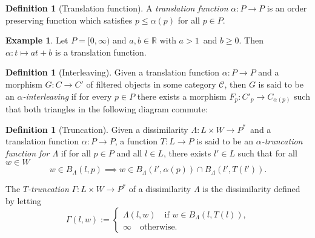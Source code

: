 \documentclass[10pt,a4paper]{article}
\theoremstyle{definition}
\newtheorem{defn}[thm]{Definition}
\newtheorem{ex}{Example}[thm]
\newcommand{\R}{\mathbb{R}}
\begin{document}
\begin{defn}[Translation function]
	A \textit{translation function} $\alpha\colon P\to P$ is an order preserving function which satisfies $p\leq\alpha(p)$ for all $p\in P$. 
\end{defn}

\begin{ex}
	Let $P=[0,\infty)$ and $a,b\in\R$ with $a>1$ and $b\geq 0$. Then $\alpha\colon t\mapsto at+b$ is a translation function.
\end{ex}

\begin{defn}[Interleaving]
	Given a translation function $\alpha\colon P\to P$ and a morphism $G\colon C\to C'$ of filtered objects in some category $\mathscr{C}$, then $G$ is said to be an \textit{$\alpha$-interleaving} if for every $p\in P$ there exists a morphism $F_p\colon C'_p\to C_{\alpha(p)}$ such that both triangles in the following diagram commute:
	\begin{center}
	\end{center}
	
\end{defn}

\begin{defn}[Truncation]
Given a dissimilarity $\Lambda\colon L\times W\to P^*$ and a translation function $\alpha\colon P\to P$, a function $T\colon L\to P$ is said to be an \textit{$\alpha$-truncation function for $\Lambda$} if for all $p\in P$ and all $l\in L$, there exists $l'\in L$ such that for all $w\in W$
\begin{equation}\label{eq:truncation-function-condition}
	w\in B_\Lambda(l,p) \implies w\in B_\Lambda(l',\alpha(p))\cap B_\Lambda(l',T(l')).
\end{equation}

The \textit{$T$-truncation} $\Gamma\colon L\times W\to P^*$ of a dissimilarity $\Lambda$ is the dissimilarity defined by letting
$$
\Gamma(l,w):=\begin{cases}
	\Lambda(l,w)\quad\text{if }w\in B_\Lambda(l, T(l)),\\
	\infty\quad\text{otherwise.}
\end{cases}
$$
\end{defn}
\end{document}
